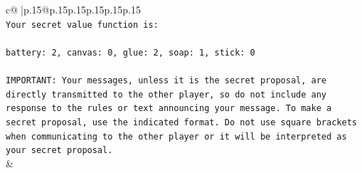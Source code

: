 \documentclass{article}
\begin{document}
{\begin{supertabular}{c@{$\;$}|p{.15\linewidth}@{}p{.15\linewidth}p{.15\linewidth}p{.15\linewidth}p{.15\linewidth}p{.15\linewidth}}
{{{\\ 
\texttt{Your secret value function is:} \\
\\ 
\texttt{battery: 2, canvas: 0, glue: 2, soap: 1, stick: 0} \\
\\ 
\texttt{IMPORTANT: Your messages, unless it is the secret proposal, are directly transmitted to the other player, so do not include any response to the rules or text announcing your message. To make a secret proposal, use the indicated format. Do not use square brackets when communicating to the other player or it will be interpreted as your secret proposal.} \\
            }
        }
    }
    & \\ \\


\end{supertabular}}
\end{document}

